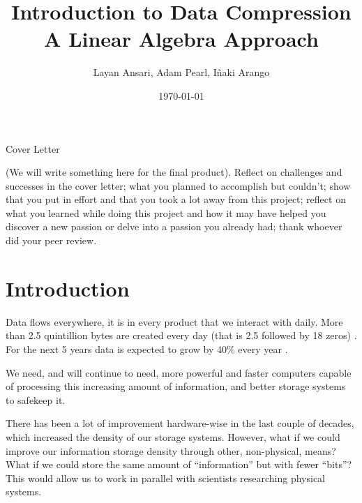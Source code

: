 \documentclass[12pt]{report}
\title{%
    \huge{Introduction to Data Compression} \\
    \large{\large{A Linear Algebra Approach}}
}
\author{\large{Layan Ansari, Adam Pearl, Iñaki Arango}}
\date{\today}
\begin{document}
    \maketitle
    
    
    \newpage%
    
    \vspace*{1cm}
    \centerline{\huge\huge Cover Letter}
    \vspace*{1cm}

    (We will write something here for the final product). Reflect on challenges and successes in the cover letter; what you planned to accomplish but couldn't; show that you put in effort and that you took a lot away from this project; reflect on what you learned while doing this project and how it may have helped you discover a new passion or delve into a passion you already had; thank whoever did your peer review.
    
    \pagebreak
    
    \tableofcontents
    
    \pagebreak

    \chapter{Introduction}
        Data flows everywhere, it is in every product that we interact with daily. More than 2.5 quintillion bytes are created every day (that is 2.5 followed by 18 zeros) \cite{alexaqz_2015}. For the next 5 years data is expected to grow by 40\% every year \cite{marr_2022}.

        We need, and will continue to need, more powerful and faster computers capable of processing this increasing amount of information, and better storage systems to safekeep it.

        There has been a lot of improvement hardware-wise in the last couple of decades, which increased the density of our storage systems. However, what if we could improve our information storage density through other, non-physical, means? What if we could store the same amount of ``information'' but with fewer ``bits''? This would allow us to work in parallel with scientists researching physical systems.
        
\end{document}
